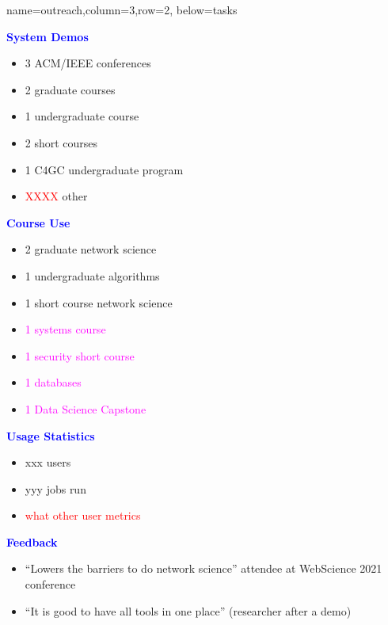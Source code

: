\documentclass[landscape,paperwidth=70in,paperheight=46in,fontscale=0.225]{baposter} %
\begin{document}
\begin{poster}
          {name=outreach,column=3,row=2, below=tasks}{
\begin{minipage}[t]{0.48 \textwidth}
\textcolor{blue}{\textbf{System Demos}}
\medskip
\begin{itemize}[leftmargin=*,noitemsep,topsep=0pt]
    \item 3 ACM/IEEE conferences  \smallskip
    \item 2 graduate courses   \smallskip 
    \item 1 undergraduate course  \smallskip
    \item 2 short courses  \smallskip
    \item 1 C4GC undergraduate program  \smallskip
    \item \textcolor{red}{XXXX} other 
\end{itemize}
\end{minipage}
\quad
\begin{minipage}[t]{0.48 \textwidth}
\textcolor{blue}{\textbf{Course Use}}\
  \medskip
\begin{itemize}[leftmargin=*,noitemsep,topsep=0pt]
    \item 2 graduate network science    \smallskip
    \item 1 undergraduate algorithms   \smallskip
    \item 1 short course network science   \smallskip
    \item \textcolor{magenta}{1 systems course}  \smallskip
    \item \textcolor{magenta}{1 security short course}  \smallskip
    \item \textcolor{magenta}{1 databases}  \smallskip
    \item \textcolor{magenta}{1 Data Science Capstone}
\end{itemize}
\end{minipage}
\qquad

\medskip

%
\begin{minipage}[t]{0.48 \textwidth}
\textcolor{blue}{\textbf{Usage Statistics}}
\medskip
\begin{itemize}[leftmargin=*,noitemsep,topsep=0pt]
    \item xxx users  \smallskip
    \item yyy jobs run \smallskip
    \item \textcolor{red}{what other user metrics}   \smallskip 
\end{itemize}
\end{minipage}
\quad
\begin{minipage}[t]{0.48 \textwidth}
\textcolor{blue}{\textbf{Feedback}}\
  \medskip
\begin{itemize}[leftmargin=*,noitemsep,topsep=0pt]
    \item ``Lowers the barriers to do network science'' attendee at WebScience 2021 conference    \smallskip
    \item ``It is good to have all tools in one place'' (researcher after a demo)
\end{itemize}
\end{minipage}
}



\end{poster}
\end{document}
